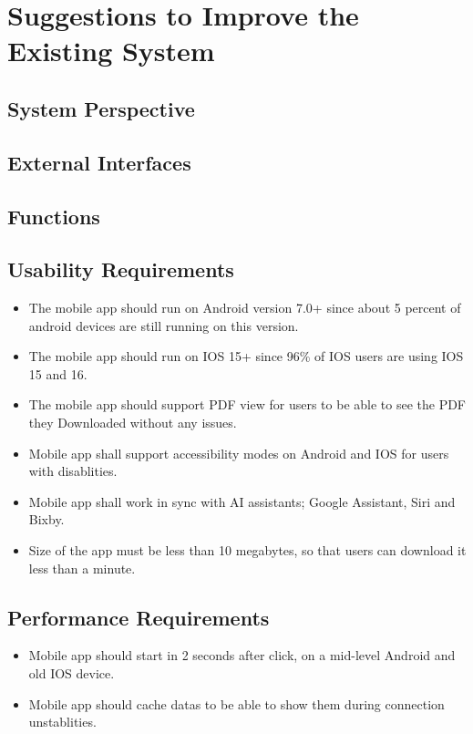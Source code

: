 \chapter{Suggestions to Improve the Existing System}

\section{System Perspective}

\section{External Interfaces}

\section{Functions}

\section{Usability Requirements}
\begin{itemize}
    \item The mobile app should run on Android version 7.0+ since about 5 percent of android devices are still running on this version.
    \item The mobile app should run on IOS 15+ since 96\% of IOS users are using IOS 15 and 16.
    \item The mobile app should support PDF view for users to be able to see the PDF they Downloaded without any issues.
    \item Mobile app shall support accessibility modes on Android and IOS for users with disablities.
    \item Mobile app shall work in sync with AI assistants; Google Assistant, Siri and Bixby.
    \item Size of the app must be less than 10 megabytes, so that users can download it less than a minute.
\end{itemize}
\section{Performance Requirements}
\begin{itemize}
    \item Mobile app should start in 2 seconds after click, on a mid-level Android and old IOS device.
    \item Mobile app should cache datas to be able to show them during connection unstablities.
\end{itemize}
